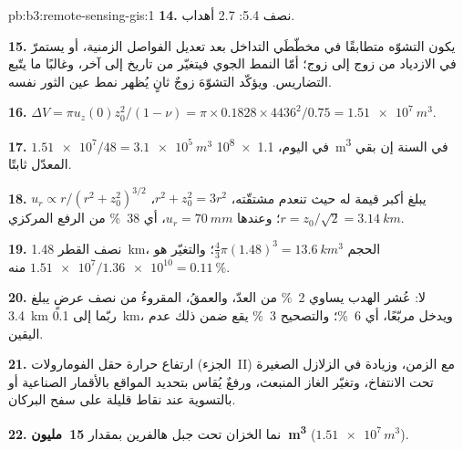 \begin{solution}{pb:b3:remote-sensing-gis:1}
\textbf{14.} نصف 5.4: 2.7 أهداب.

\textbf{15.} يكون التشوّه متطابقًا في مخطّطَي التداخل بعد
تعديل الفواصل الزمنية، أو يستمرّ في الازدياد من زوج إلى زوج؛ أمّا
النمط الجوي فيتغيّر من تاريخ إلى آخر، وغالبًا ما يتّبع
التضاريس. ويؤكّد التشوّهَ زوجٌ ثانٍ يُظهر
نمط عين الثور نفسه.

\textbf{16.} $\Delta V = \pi u_z(0)z_0^2/(1 - \nu) = \pi\times0.1828\times
4436^2/0.75 = \qty{1.51e7}{m^3}$.

\textbf{17.} $\num{1.51e7}/48 = \qty{3.1e5}{m^3}$ في اليوم، \qty{1.1e8}{m^3}
في السنة إن بقي المعدّل ثابتًا.

\textbf{18.} $u_r \propto r/(r^2 + z_0^2)^{3/2}$ يبلغ أكبر قيمة له حيث تنعدم
مشتقّته، $r^2 + z_0^2 = 3r^2$، $r = z_0/\sqrt2 = \qty{3.14}{km}$؛
وعندها $u_r = \qty{70}{mm}$، أي \qty{38}{\percent} من الرفع المركزي.

\textbf{19.} نصف القطر \qty{1.48}{km}، الحجم $\frac43\pi(1.48)^3 =
\qty{13.6}{km^3}$؛ والتغيّر هو $\num{1.51e7}/\num{1.36e10} =
\qty{0.11}{\percent}$ منه.

\textbf{20.} لا: عُشر الهدب يساوي \qty{2}{\percent} من العدّ،
والعمقُ، المقروءُ من نصف عرضٍ يبلغ \qty{3.4}{km} ربّما إلى
\qty{0.1}{km}، ويدخل مربّعًا، أي \qty{6}{\percent}؛ والتصحيح \qty{3}{\percent}
يقع ضمن ذلك عدم اليقين.

\textbf{21.} ارتفاع حرارة حقل الفومارولات (الجزء~II) مع الزمن، وزيادة
في الزلازل الصغيرة تحت الانتفاخ، وتغيّر الغاز
المنبعث، ورفعٌ يُقاس بتحديد المواقع بالأقمار الصناعية أو بالتسوية عند
نقاط قليلة على سفح البركان.

\textbf{22.} نما الخزان تحت جبل هالفرين بمقدار
\textbf{15~مليون~\unit[text-series-to-math=true]{m^3}} ($\num{1.51e7}\,\unit{m^3}$).
\end{solution}
